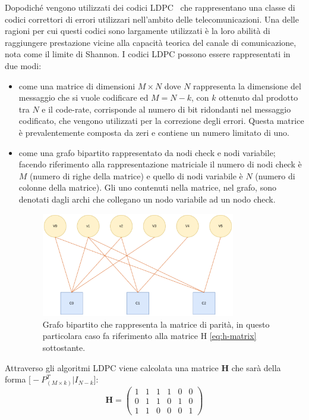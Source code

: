 Dopodich\'e vengono utilizzati dei codici LDPC~\cite{borwankar_low_nodate} che rappresentano una classe di codici correttori di errori utilizzari nell'ambito delle telecomunicazioni. Una delle ragioni per cui questi codici sono largamente utilizzati \`e la loro abilit\`a di raggiungere prestazione vicine alla capacit\`a teorica del canale di comunicazione, nota come il limite di Shannon. I codici LDPC possono essere rappresentati in due modi:
\begin{itemize}
\item come una matrice di dimensioni $M \times N$ dove $N$ rappresenta la dimensione del messaggio che si vuole codificare ed $M = N - k$, con $k$ ottenuto dal prodotto tra $N$ e il code-rate, corrisponde al numero di bit ridondanti nel messaggio codificato, che vengono utilizzati per la correzione degli errori. Questa matrice \`e prevalentemente composta da zeri e contiene un numero limitato di uno.
\item come una grafo bipartito rappresentato da nodi check e nodi variabile; facendo riferimento alla rappresentazione matriciale il numero di nodi check \`e $M$ (numero di righe della matrice) e quello di nodi variabile \`e $N$ (numero di colonne della matrice). Gli uno contenuti nella matrice, nel grafo, sono denotati dagli archi che collegano un nodo variabile ad un nodo check.
\begin{figure}[H] 
\begin{center}
\includegraphics[width=0.8\textwidth]{figure/tanner_graph.eps} 
\end{center}
\caption[Grafo bipartito]{Grafo bipartito che rappresenta la matrice di parit\`a, in questo particolara caso fa riferimento alla matrice H \ref{eq:h-matrix} sottostante.}
\end{figure}
\end{itemize}

Attraverso gli algoritmi LDPC viene calcolata una matrice \textbf{H} che sar\`a della forma $\bigl [ -P^T_{(M \times k)} | I_{N-k}\bigr ]$:
\begin{equation} \label{eq:h-matrix}
\textbf{H} =
\begin{pmatrix}
 1 & 1 & 1 & 1 & 0 & 0 \\
 0 & 1 & 1 & 0 & 1 & 0 \\
 1 & 1 & 0 & 0 & 0 & 1
\end{pmatrix}
\end{equation}

